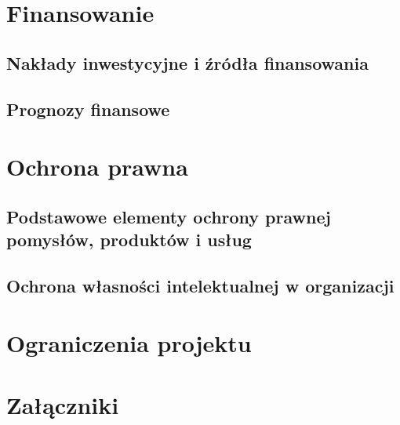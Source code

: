 \documentclass{article}
\begin{document}
\section{Finansowanie}
\subsection{Nakłady inwestycyjne i źródła finansowania}
\subsection{Prognozy finansowe}


\section{Ochrona prawna}
\subsection{Podstawowe elementy ochrony prawnej pomysłów, produktów i usług}
\subsection{Ochrona własności intelektualnej w organizacji}


\section{Ograniczenia projektu}


\section{Załączniki}
\end{document}
